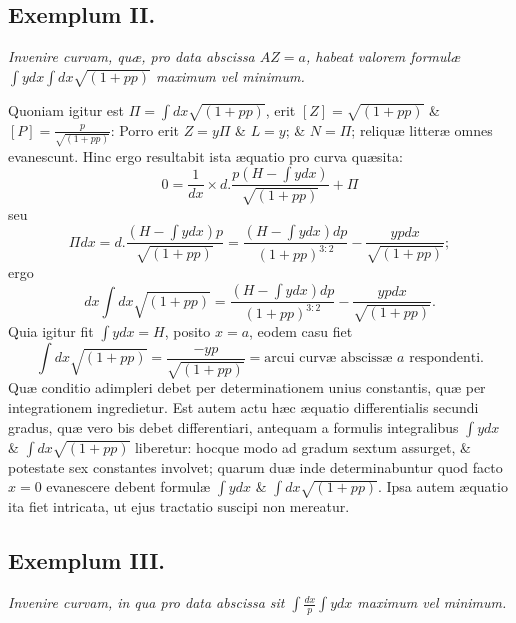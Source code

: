 \subsection*{Exemplum II.}
\textit{Invenire curvam, quæ, pro data abscissa $AZ=a$, habeat valorem formulæ $\int ydx\int dx\sqrt{(1+pp)}$ maximum vel minimum.}

Quoniam igitur est $\Pi=\int dx\sqrt{(1+pp)}$, erit $[Z]=\sqrt{(1+pp)}$ \& $[P]=\frac p{\sqrt{(1+pp)}}$: Porro erit $Z=y\Pi$ \& $L=y$; \& $N=\Pi$; reliquæ litteræ omnes evanescunt. Hinc ergo resultabit ista æquatio pro curva quæsita:
\[0=\frac1{dx}\times d.\frac{p(H-\int ydx)}{\sqrt{(1+pp)}}+\Pi\]
seu
\[\Pi dx=d.\frac{(H-\int ydx)p}{\sqrt{(1+pp)}}=\frac{(H-\int ydx)dp}{(1+pp)^{3:2}}-\frac{ypdx}{\sqrt{(1+pp)}};\]
ergo
\[dx\int dx\sqrt{(1+pp)}=\frac{(H-\int ydx)dp}{(1+pp)^{3:2}}-\frac{ypdx}{\sqrt{(1+pp)}}.\]
Quia igitur fit $\int ydx=H$, posito $x=a$, eodem casu fiet
\[\int dx\sqrt{(1+pp)}=\frac{-yp}{\sqrt{(1+pp)}}=\text{arcui curvæ abscissæ }a\text{ respondenti}.\] Quæ conditio adimpleri debet per determinationem unius constantis, quæ per integrationem ingredietur. Est autem actu hæc æquatio differentialis secundi gradus, quæ vero bis debet differentiari, antequam a formulis integralibus $\int ydx$ \& $\int dx\sqrt{(1+pp)}$ liberetur: hocque modo ad gradum sextum assurget, \& potestate sex constantes involvet; quarum duæ inde determinabuntur quod facto $x=0$ evanescere debent formulæ $\int ydx$ \& $\int dx\sqrt{(1+pp)}$. Ipsa autem æquatio ita fiet intricata, ut ejus tractatio suscipi non mereatur.
\subsection*{Exemplum III.}
\textit{Invenire curvam, in qua pro data abscissa sit $\int\frac{dx}{p}\int ydx$ maximum vel minimum.}

